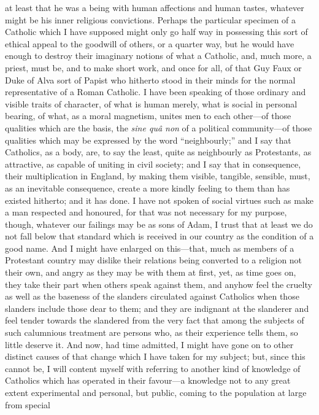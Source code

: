 at least that he was a being with human affections and human tastes,
whatever might be his inner religious convictions. Perhaps the
particular specimen of a Catholic which I have supposed might only go
half way in possessing this sort of ethical appeal to the goodwill of
others, or a quarter way, but he would have enough to destroy their
imaginary notions of what a Catholic, and, much more, a priest, must
be, and to make short work, and once for all, of that Guy Faux or Duke
of Alva sort of Papist who hitherto stood in their minds for the
normal representative of a Roman Catholic. I have been speaking of
those ordinary and visible traits of character, of what is human
merely, what is social in personal bearing, of what, as a moral
magnetism, unites men to each other—of those qualities which are the
basis, the \emph{sine quâ non} of a political community—of those
qualities which may be expressed by the word ``neighbourly;'' and I say
that Catholics, as a body, are, to say the least, quite as neighbourly
as Protestants, as attractive, as capable of uniting in civil society;
and I say that in consequence, their multiplication in England, by
making them visible, tangible, sensible, must, as an inevitable
consequence, create a more kindly feeling to them than has existed
hitherto; and it has done. I have not spoken of social virtues such as
make a man respected and honoured, for that was not necessary for my
purpose, though, whatever our failings may be as sons of Adam, I trust
that at least we do not fall below that standard which is received in
our country as the condition of a good name. And I might have enlarged
on this—that, much as members of a Protestant country may dislike
their relations being converted to a religion not their own, and angry
as they may be with them at first, yet, as time goes on, they take
their part when others speak against them, and anyhow feel the cruelty
as well as the baseness of the slanders circulated against Catholics
when those slanders include those dear to them; and they are indignant
at the slanderer and feel tender towards the slandered from the
very fact that among the subjects of such calumnious treatment are
persons who, as their experience tells them, so little deserve it. And
now, had time admitted, I might have gone on to other distinct causes
of that change which I have taken for my subject; but, since this
cannot be, I will content myself with referring to another kind of
knowledge of Catholics which has operated in their favour—a
knowledge not to any great extent experimental and personal, but
public, coming to the population at large from special
